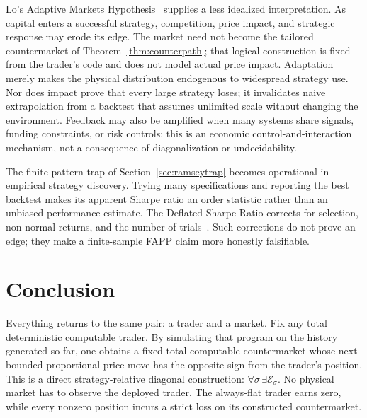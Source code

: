 \documentclass[aps,pra,reprint,superscriptaddress,amsmath,amssymb,floatfix]{revtex4-2}
\theoremstyle{plain}
\theoremstyle{definition}
\theoremstyle{remark}
\begin{document}
Lo's Adaptive Markets Hypothesis~\cite{Lo2004} supplies a less idealized
interpretation. As capital enters a successful strategy, competition, price
impact, and strategic response may erode its edge. The market need not become
the tailored countermarket of Theorem~\ref{thm:counterpath}; that logical
construction is fixed from the trader's code and does not model actual price
impact. Adaptation merely makes the physical distribution endogenous to
widespread strategy use. Nor does impact prove that every large strategy
loses; it invalidates naive extrapolation from a backtest that assumes
unlimited scale without changing the environment. Feedback may also be
amplified when many systems share signals, funding constraints, or risk
controls; this is an economic control-and-interaction mechanism, not a
consequence of diagonalization or undecidability.

The finite-pattern trap of Section~\ref{sec:ramseytrap} becomes operational in
empirical strategy discovery. Trying many specifications and reporting the
best backtest makes its apparent Sharpe ratio an order statistic rather than
an unbiased performance estimate. The Deflated Sharpe Ratio corrects for
selection, non-normal returns, and the number of
trials~\cite{BaileyLopez2014}. Such corrections do not prove an edge; they make
a finite-sample FAPP claim more honestly falsifiable.

\section{Conclusion}
\label{sec:conclusion}

Everything returns to the same pair: a trader and a market. Fix any total
deterministic computable trader. By simulating that program on the history
generated so far, one obtains a fixed total computable countermarket whose
next bounded proportional price move has the opposite sign from the trader's
position. This is a direct strategy-relative diagonal construction:
\(\forall\sigma\,\exists\mathcal E_\sigma\). No physical market has to observe
the deployed trader. The always-flat trader earns zero, while every nonzero
position incurs a strict loss on its constructed countermarket.
\end{document}
